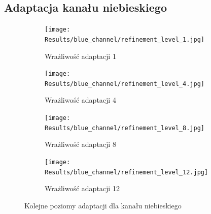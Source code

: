 \documentclass{article}
\begin{document}
\subsection{Adaptacja kanału niebieskiego}

\begin{figure}[H]
    \centering
    \begin{subfigure}[b]{0.45\textwidth}
        \texttt{[image: Results/blue\_channel/refinement\_level\_1.jpg]}
        \caption{Wrażliwość adaptacji 1}
    \end{subfigure}
    \begin{subfigure}[b]{0.45\textwidth}
        \texttt{[image: Results/blue\_channel/refinement\_level\_4.jpg]}
        \caption{Wrażliwość adaptacji 4}
    \end{subfigure}
    \begin{subfigure}[b]{0.45\textwidth}
        \texttt{[image: Results/blue\_channel/refinement\_level\_8.jpg]}
        \caption{Wrażliwość adaptacji 8}
    \end{subfigure}
    \begin{subfigure}[b]{0.45\textwidth}
        \texttt{[image: Results/blue\_channel/refinement\_level\_12.jpg]}
        \caption{Wrażliwość adaptacji 12}
    \end{subfigure}
    \caption{Kolejne poziomy adaptacji dla kanału niebieskiego}
    \label{fig:blue-channel-levels}
\end{figure}
\end{document}
